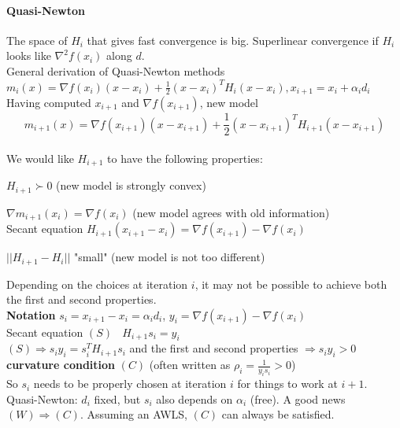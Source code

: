 \documentclass[10pt]{report}
\begin{document}
\paragraph{Quasi-Newton} The space of $H_i$ that gives fast convergence is big. Superlinear convergence if $H_i$ looks like $\nabla^2 f(x_i)$ along $d$.\\
General derivation of Quasi-Newton methods $m_i(x) = \nabla f(x_i)(x-x_i)+\frac{1}{2}(x-x_i)^TH_i(x-x_i), x_{i+1} = x_i+\alpha_id_i$\\
Having computed $x_{i+1}$ and $\nabla f(x_{i+1})$, new model
$$m_{i+1}(x) = \nabla f(x_{i+1})(x-x_{i+1})+\frac{1}{2}(x-x_{i+1})^TH_{i+1}(x-x_{i+1})$$\\
We would like $H_{i+1}$ to have the following properties:
\begin{list}{}{}
	\item $H_{i+1}\succ 0$ (new model is strongly convex)
	\item $\nabla m_{i+1}(x_i) = \nabla f(x_i)$ (new model agrees with old information)\\
	Secant equation $H_{i+1}(x_{i+1}-x_i)=\nabla f(x_{i+1})-\nabla f(x_i)$
	\item $||H_{i+1} - H_i||$ "small" (new model is not too different)
\end{list}
Depending on the choices at iteration $i$, it may not be possible to achieve both the first and second properties.\\
\textbf{Notation} $s_i = x_{i+1}- x_i = \alpha_id_i$, $y_i = \nabla f(x_{i+1}) -\nabla f(x_i)$\\
Secant equation $(S)\:\:\:\:H_{i+1}s_i = y_i$\\
$(S)\Rightarrow s_iy_i = s_i^TH_{i+1}s_i$ and the first and second properties $\Rightarrow s_iy_i > 0$ \textbf{curvature condition} $(C)$ (often written as $\rho_i = \frac{1}{y_is_i} > 0$)\\
So $s_i$ needs to be properly chosen at iteration $i$ for things to work at $i+1$.\\
Quasi-Newton: $d_i$ fixed, but $s_i$ also depends on $\alpha_i$ (free). A good news $(W)\Rightarrow (C)$. Assuming an AWLS, $(C)$ can always be satisfied.
\end{document}
